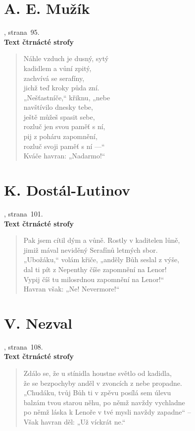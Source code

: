 \documentclass[dp.tex]{subfiles}
\begin{document}
\section*{A. E. Mužík}
, strana~95.
\\\textbf{Text čtrnácté strofy}
\begin{verse}
 Náhle vzduch je dusný, sytý\\
 kadidlem a vůní zpitý,\\
 zachvívá se serafíny,\\
 jichž teď kroky půda zní.\\
 „Nešťastníče,“ křiknu, „nebe\\
 navštívilo dnesky tebe,\\
 ještě můžeš spasit sebe,\\
 rozluč jen svou paměť s ní,\\
 pij z poháru zapomnění,\\
 rozluč svoji paměť s ní —“\\
 Kváče havran: „Nadarmo!“
\end{verse}

\section*{K. Dostál-Lutinov}
, strana~101.
\\\textbf{Text čtrnácté strofy}
\begin{verse}
 Pak jsem cítil dým a vůně. Rostly v kaditelen lůně,\\
 jimiž mával neviděný Serafínů letmých sbor.\\
 „Ubožáku,“ volám křiče, „anděly Bůh seslal z výše,\\
 dal ti pít z Nepenthy číše zapomnění na Lenor!\\
 Vypij číš tu milosrdnou zapomnění na Lenor!“\\
\hspace*{0.8cm}Havran však: „Ne! Nevermore!“
\end{verse}

\section*{V. Nezval}
, strana~108.
\\\textbf{Text čtrnácté strofy}
\begin{verse}
Zdálo se, že u stínidla houstne světlo od kadidla,\\
že se bezpochyby anděl v zvoncích z nebe propadne.\\
„Chudáku, tvůj Bůh ti v zpěvu posílá sem úlevu\\
balzám tvou starou něhu, po němž navždy vychladne\\
po němž láska k Lenoře v tvé mysli navždy zapadne“ –\\
\hspace*{0.8cm}Však havran děl: „Už víckrát ne.“
\end{verse}
\end{document}

